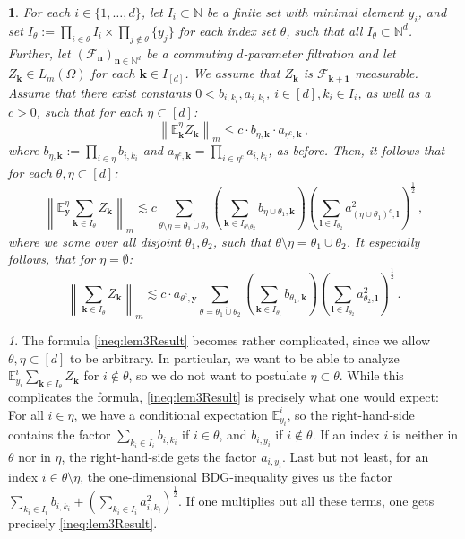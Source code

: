 \documentclass[11pt,oneside,english,reqno]{amsart}
\numberwithin{equation}{section}
\numberwithin{figure}{section}
\theoremstyle{plain}
\theoremstyle{definition}
\theoremstyle{remark}
\newtheorem{rem}[thm]{\protect\remarkname}
\theoremstyle{plain}
\newtheorem{lem}[thm]{\protect\lemmaname}
\theoremstyle{plain}
\theoremstyle{plain}
\theoremstyle{plain}
\theoremstyle{plain}
\providecommand{\lemmaname}{Lemma}
\providecommand{\remarkname}{Remark}
\newcommand{\cF}{\mathcal{F}}
\newcommand{\EE}{\mathbb{E}}
\newcommand{\NN}{\mathbb{N}}
\newcommand{\bk}{\mathbf{k}}
\newcommand{\bl}{\mathbf l}
\newcommand{\bn}{\mathbf{n}}
\newcommand{\by}{\mathbf{y}}
\newcommand{\norm}[1]{\left\lVert #1\right\rVert}
\begin{document}
%
\begin{lem}\label{multiparameter BDG}
    For each $i\in\{1,\dots,d\}$, let $I_i\subset\NN$ be a finite set with minimal element $y_i$, and set $I_\theta := \prod_{i\in\theta} I_i\times\prod_{j\notin\theta}\{y_j\}$ for each index set $\theta$, such that all $I_\theta\subset\NN^d$. Further, let $(\mathcal F_\bn)_{\bn\in\NN^d}$ be a commuting $d$-parameter filtration and let $Z_\bk\in L_m(\Omega)$ for each $\bk\in I_{[d]}$. We assume that $Z_\bk$ is $\cF_{\bk+ \boldsymbol 1}$ measurable. Assume that there exist constants $0<b_{i,k_i}, a_{i,k_i}$, $i\in[d], k_i\in I_i$, as well as a $c>0$, such that for each $\eta\subset[d]$:
%
\begin{equation}\label{ineq:lem3Condtition}
    \norm{\EE^\eta_\bk Z_{\bk}}_m\le c \cdot b_{\eta,\bk} \cdot a_{\eta^c,\bk}\,,
\end{equation}
%
where $b_{\eta,\bk} := \prod_{i\in\eta} b_{i,k_i}$ and $a_{\eta^c,\bk} = \prod_{i\in\eta^c}a_{i,k_i}$, as before. Then, it follows that for each $\theta,\eta\subset[d]$:
%
\begin{equation}\label{ineq:lem3Result}
    \norm{\EE^\eta_{\mathbf y}\sum_{\bk\in I_{\theta}} Z_{\bk}}_m\lesssim c\sum_{\theta\setminus\eta = \theta_1\dot\cup \theta_2} \left(\sum_{\bk\in I_{\theta\setminus\theta_2}} b_{\eta\cup\theta_1,\bk}\right) \left(\sum_{\bl\in I_{\theta_2}} a_{(\eta\cup\theta_1)^c,\bl}^2\right)^{\frac 12}\,,
\end{equation}
%
where we some over all disjoint $\theta_1,\theta_2$, such that $\theta\setminus\eta=\theta_1\cup\theta_2$. It especially follows, that for $\eta =\emptyset$:
%
\begin{equation*}
    \norm   {\sum_{\bk\in I_{\theta}} Z_{\bk}}_m\lesssim c\cdot a_{\theta^c,\by}\sum_{\theta = \theta_1\dot\cup \theta_2} \left(\sum_{\bk\in I_{\theta_1}} b_{\theta_1,\bk}\right) \left(\sum_{\bl\in I_{\theta_2}} a_{\theta_2,\bl}^2\right)^{\frac 12}\,.
\end{equation*}
\end{lem}
%
\begin{rem}
    The formula \eqref{ineq:lem3Result} becomes rather complicated, since we allow $\theta,\eta\subset[d]$ to be arbitrary. In particular, we want to be able to analyze $\EE^i_{y_i}\sum_{\bk\in I_{\theta}} Z_{\bk}$ for $i\notin\theta$, so we do not want to postulate $\eta\subset\theta$. While this complicates the formula, \eqref{ineq:lem3Result} is precisely what one would expect: For all $i\in\eta$, we have a conditional expectation $\EE^i_{y_i}$, so the right-hand-side contains the factor $\sum_{k_i\in I_i} b_{i,k_i}$ if $i\in\theta$, and $b_{i,y_i}$ if $i\notin\theta$. If an index $i$ is neither in $\theta$ nor in $\eta$, the right-hand-side gets the factor $a_{i,y_i}$. Last but not least, for an index $i\in\theta\setminus\eta$, the one-dimensional BDG-inequality gives us the factor $\sum_{k_i\in I_i} b_{i,k_i} + \left(\sum_{k_i\in I_i} a^2_{i,k_i}\right)^\frac 12$. If one multiplies out all these terms, one gets precisely \eqref{ineq:lem3Result}.
\end{rem}
\end{document}
